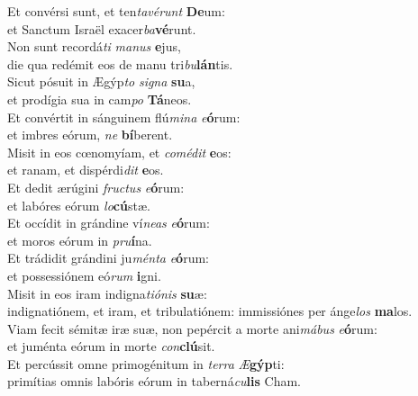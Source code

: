 \evenverse Et convérsi sunt, et ten\textit{ta}\textit{vé}\textit{runt} \textbf{De}um:~\*\\
\evenverse et Sanctum Israël exacer\textit{ba}\textbf{vé}runt.\\
\oddverse Non sunt recordá\textit{ti} \textit{ma}\textit{nus} \textbf{e}jus,~\*\\
\oddverse die qua redémit eos de manu tri\textit{bu}\textbf{lán}tis.\\
\evenverse Sicut pósuit in Ægýp\textit{to} \textit{si}\textit{gna} \textbf{su}a,~\*\\
\evenverse et prodígia sua in cam\textit{po} \textbf{Tá}neos.\\
\oddverse Et convértit in sánguinem flú\textit{mi}\textit{na} \textit{e}\textbf{ó}rum:~\*\\
\oddverse et imbres eórum, \textit{ne} \textbf{bí}berent.\\
\evenverse Misit in eos cœnomyíam, et \textit{co}\textit{mé}\textit{dit} \textbf{e}os:~\*\\
\evenverse et ranam, et dispérdi\textit{dit} \textbf{e}os.\\
\oddverse Et dedit ærúgini \textit{fru}\textit{ctus} \textit{e}\textbf{ó}rum:~\*\\
\oddverse et labóres eórum \textit{lo}\textbf{cú}stæ.\\
\evenverse Et occídit in grándine ví\textit{ne}\textit{as} \textit{e}\textbf{ó}rum:~\*\\
\evenverse et moros eórum in \textit{pru}\textbf{í}na.\\
\oddverse Et trádidit grándini ju\textit{mén}\textit{ta} \textit{e}\textbf{ó}rum:~\*\\
\oddverse et possessiónem eó\textit{rum} \textbf{i}gni.\\
\evenverse Misit in eos iram indigna\textit{ti}\textit{ó}\textit{nis} \textbf{su}æ:~\*\\
\evenverse indignatiónem, et iram, et tribulatiónem: immissiónes per ánge\textit{los} \textbf{ma}los.\\
\oddverse Viam fecit sémitæ iræ suæ, non pepércit a morte ani\textit{má}\textit{bus} \textit{e}\textbf{ó}rum:~\*\\
\oddverse et juménta eórum in morte \textit{con}\textbf{clú}sit.\\
\evenverse Et percússit omne primogénitum in \textit{ter}\textit{ra} \textit{Æ}\textbf{gýp}ti:~\*\\
\evenverse primítias omnis labóris eórum in taberná\textit{cu}\textbf{lis} Cham.\\

